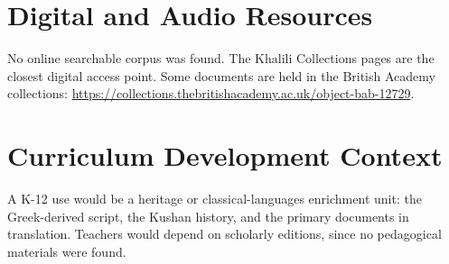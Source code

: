 \documentclass[12pt]{article}
\begin{document}
\section{Digital and Audio Resources}
No online searchable corpus was found. The Khalili Collections pages are the closest digital access point. Some documents are held in the British Academy collections: \url{https://collections.thebritishacademy.ac.uk/object-bab-12729}.

\section{Curriculum Development Context}
A K-12 use would be a heritage or classical-languages enrichment unit: the Greek-derived script, the Kushan history, and the primary documents in translation. Teachers would depend on scholarly editions, since no pedagogical materials were found.
\end{document}

